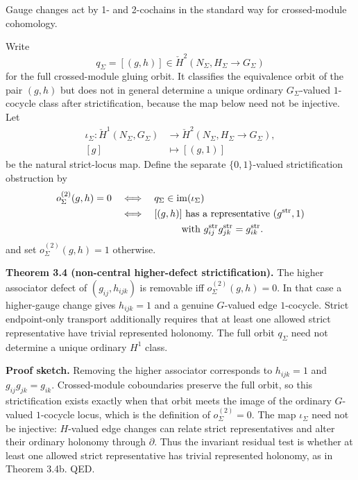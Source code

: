 Gauge changes act by 1- and 2-cochains in the standard way for crossed-module cohomology.

Write
\[
q_\Sigma=[(g,h)]\in\check H^2(N_\Sigma,H_\Sigma\to G_\Sigma)
\]
for the full crossed-module gluing orbit. It classifies the equivalence orbit of the pair \((g,h)\)
but does not in general determine a unique ordinary \(G_\Sigma\)-valued \(1\)-cocycle class after
strictification, because the map below need not be injective. Let
\[
\begin{aligned}
\iota_\Sigma:\check H^1(N_\Sigma,G_\Sigma)
&\longrightarrow\check H^2(N_\Sigma,H_\Sigma\to G_\Sigma),\\
[g]&\longmapsto[(g,1)]
\end{aligned}
\]
be the natural strict-locus map. Define the separate \(\{0,1\}\)-valued strictification obstruction by
\[
\begin{aligned}
o^{(2)}_\Sigma(g,h)=0
&\quad\Longleftrightarrow\quad q_\Sigma\in\operatorname{im}(\iota_\Sigma)\\
&\quad\Longleftrightarrow\quad [(g,h)]\text{ has a representative }(g^{\mathrm{str}},1)\\
&\hspace{7.2em}\text{with }g^{\mathrm{str}}_{ij}g^{\mathrm{str}}_{jk}=g^{\mathrm{str}}_{ik}.
\end{aligned}
\]
and set \(o^{(2)}_\Sigma(g,h)=1\) otherwise.

\textbf{Theorem 3.4 (non-central higher-defect strictification).} The higher associator defect of
\((g_{ij},h_{ijk})\) is removable iff \(o^{(2)}_\Sigma(g,h)=0\). In that case a higher-gauge change
gives \(h_{ijk}=1\) and a genuine \(G\)-valued edge \(1\)-cocycle. Strict endpoint-only transport
additionally requires that at least one allowed strict representative have trivial represented
holonomy. The full orbit \(q_\Sigma\) need not determine a unique ordinary \(H^1\) class.

\textbf{Proof sketch.} Removing the higher associator corresponds to \(h_{ijk}=1\) and
\(g_{ij}g_{jk}=g_{ik}\). Crossed-module coboundaries preserve the full orbit, so this
strictification exists exactly when that orbit meets the image of the ordinary \(G\)-valued
\(1\)-cocycle locus, which is the definition of \(o^{(2)}_\Sigma=0\). The map \(\iota_\Sigma\)
need not be injective: \(H\)-valued edge changes can relate strict representatives and alter their
ordinary holonomy through \(\partial\). Thus the invariant residual test is whether at least one
allowed strict representative has trivial represented holonomy, as in Theorem 3.4b. QED.

